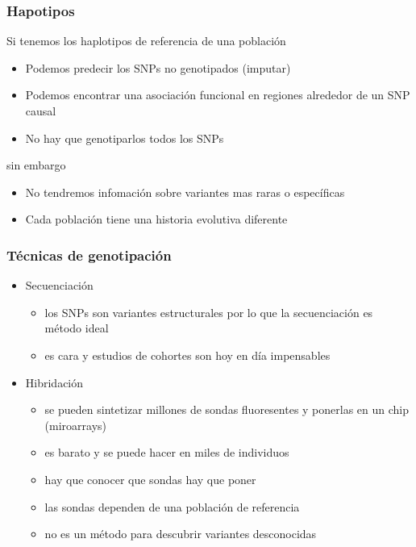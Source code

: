 \documentclass{beamer}\usepackage[]{graphicx}\usepackage[]{color}
\begin{document}
\begin{frame}[fragile] 
\frametitle{Hapotipos}

Si tenemos los haplotipos de referencia de una poblaci\'on
\begin{itemize}
\item Podemos predecir los SNPs no genotipados (imputar)
\item Podemos encontrar una asociaci\'on funcional en regiones alrededor de un SNP causal
\item No hay que genotiparlos todos los SNPs
\end{itemize}

sin embargo
\begin{itemize}
\item No tendremos infomaci\'on sobre variantes mas raras o espec\'ificas
\item Cada poblaci\'on tiene una historia evolutiva diferente
\end{itemize}

\end{frame}



\begin{frame}[fragile] 
\frametitle{T\'ecnicas de genotipaci\'on}
\begin{itemize}
\item Secuenciaci\'on
\begin{itemize}
\item los SNPs son variantes estructurales por lo que la secuenciaci\'on es m\'etodo ideal
\item es cara y estudios de cohortes son hoy en d\'ia impensables
\end{itemize}

\item Hibridaci\'on
\begin{itemize}
\item se pueden sintetizar millones de sondas fluoresentes y ponerlas en un chip (miroarrays)
\item es barato y se puede hacer en miles de individuos
\item hay que conocer que sondas hay que poner
\item las sondas dependen de una poblaci\'on de referencia 
\item no es un m\'etodo para descubrir variantes desconocidas
\end{itemize}
\end{itemize}

\end{frame}
\end{document}
